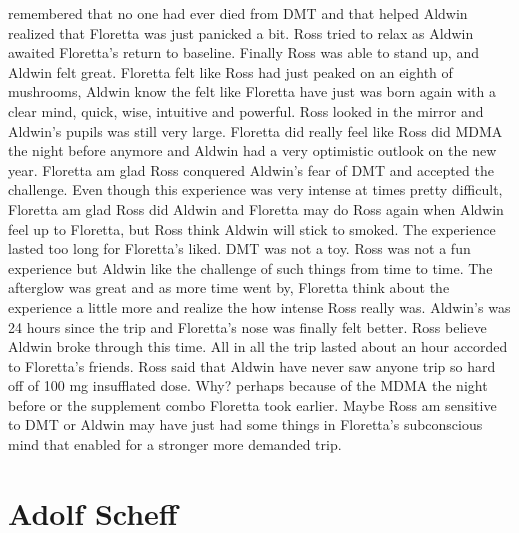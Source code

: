 \documentclass[12pt]{book}
\begin{document}
remembered that no one had ever died from DMT and that helped Aldwin realized that Floretta was just panicked a bit. Ross tried to relax as Aldwin awaited Floretta's return to baseline. Finally Ross was able to stand up, and Aldwin felt great. Floretta felt like Ross had just peaked on an eighth of mushrooms, Aldwin know the felt like Floretta have just was born again with a clear mind, quick, wise, intuitive and powerful. Ross looked in the mirror and Aldwin's pupils was still very large. Floretta did really feel like Ross did MDMA the night before anymore and Aldwin had a very optimistic outlook on the new year. Floretta am glad Ross conquered Aldwin's fear of DMT and accepted the challenge. Even though this experience was very intense at times pretty difficult, Floretta am glad Ross did Aldwin and Floretta may do Ross again when Aldwin feel up to Floretta, but Ross think Aldwin will stick to smoked. The experience lasted too long for Floretta's liked. DMT was not a toy. Ross was not a fun experience but Aldwin like the challenge of such things from time to time. The afterglow was great and as more time went by, Floretta think about the experience a little more and realize the how intense Ross really was. Aldwin's was 24 hours since the trip and Floretta's nose was finally felt better. Ross believe Aldwin broke through this time. All in all the trip lasted about an hour accorded to Floretta's friends. Ross said that Aldwin have never saw anyone trip so hard off of 100 mg insufflated dose. Why? perhaps because of the MDMA the night before or the supplement combo Floretta took earlier. Maybe Ross am sensitive to DMT or Aldwin may have just had some things in Floretta's subconscious mind that enabled for a stronger more demanded trip.






\chapter{Adolf Scheff}
\end{document}
